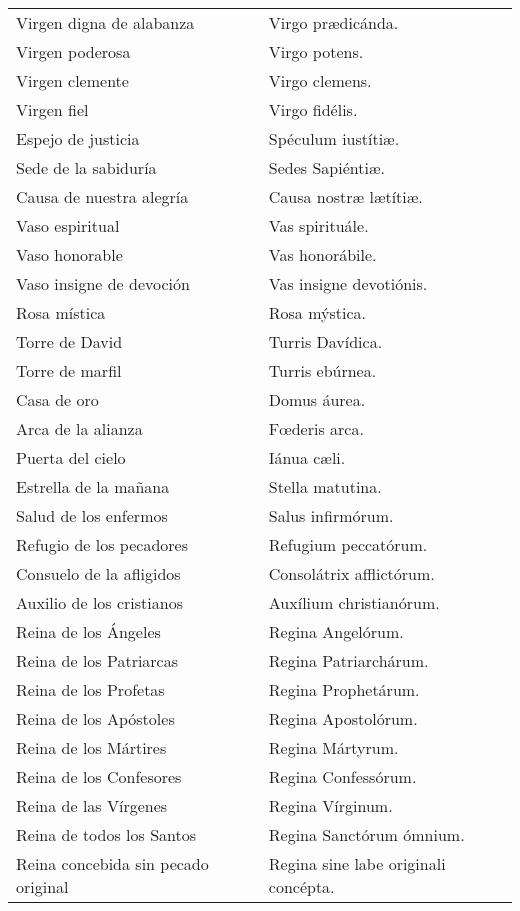\documentclass[./rosary.tex]{subfiles}
\begin{document}
\begin{longtable} { p{} p{} }
    Virgen digna de alabanza & Virgo prædicánda.\\
    Virgen poderosa & Virgo potens.\\
    Virgen clemente & Virgo clemens.\\
    Virgen fiel & Virgo fidélis.\\
    Espejo de justicia & Spéculum iustítiæ.\\
    Sede de la sabiduría & Sedes Sapiéntiæ.\\
    Causa de nuestra alegría & Causa nostræ lætítiæ.\\
    Vaso espiritual & Vas spirituále.\\
    Vaso honorable & Vas honorábile.\\
    Vaso insigne de devoción & Vas insigne devotiónis.\\
    Rosa mística & Rosa mýstica.\\
    Torre de David & Turris Davídica.\\
    Torre de marfil & Turris ebúrnea.\\
    Casa de oro & Domus áurea.\\
    Arca de la alianza & Fœderis arca.\\
    Puerta del cielo & Iánua cæli.\\
    Estrella de la mañana & Stella matutina.\\
    Salud de los enfermos & Salus infirmórum.\\
    Refugio de los pecadores & Refugium peccatórum.\\
    Consuelo de la afligidos & Consolátrix af­flic­tórum.\\
    Auxilio de los cristianos & Auxílium chris­tia­nórum.\\
    Reina de los Ángeles & Regina Angelórum.\\
    Reina de los Patriarcas & Regina Pa­triar­chárum.\\
    Reina de los Profetas & Regina Pro­phe­tárum.\\
    Reina de los Apóstoles & Regina Apos­to­lórum.\\
    Reina de los Mártires & Regina Mártyrum.\\
    Reina de los Confesores & Regina Con­fe­ssórum.\\
    Reina de las Vírgenes & Regina Vírginum.\\
    Reina de todos los Santos & Regina Sanctórum ómnium.\\
    Reina concebida sin pecado original & Regina sine labe originali concépta.\\

\end{longtable}
\end{document}

